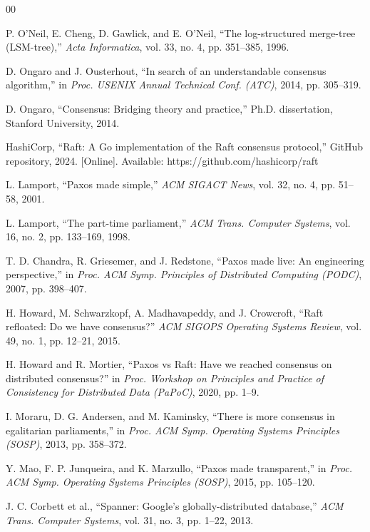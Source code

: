 \documentclass[conference, a4paper]{IEEEtran}
\begin{document}
\begin{thebibliography}{00}

P. O'Neil, E. Cheng, D. Gawlick, and E. O'Neil, ``The log-structured
merge-tree (LSM-tree),'' \textit{Acta Informatica}, vol. 33, no. 4,
pp. 351--385, 1996.

D. Ongaro and J. Ousterhout, ``In search of an understandable consensus
algorithm,'' in \textit{Proc. USENIX Annual Technical Conf. (ATC)},
2014, pp. 305--319.

D. Ongaro, ``Consensus: Bridging theory and practice,'' Ph.D.
dissertation, Stanford University, 2014.

HashiCorp, ``Raft: A Go implementation of the Raft consensus
protocol,'' GitHub repository, 2024. [Online]. Available:
https://github.com/hashicorp/raft

L. Lamport, ``Paxos made simple,'' \textit{ACM SIGACT News}, vol. 32,
no. 4, pp. 51--58, 2001.

L. Lamport, ``The part-time parliament,'' \textit{ACM Trans. Computer
Systems}, vol. 16, no. 2, pp. 133--169, 1998.

T. D. Chandra, R. Griesemer, and J. Redstone, ``Paxos made live: An
engineering perspective,'' in \textit{Proc. ACM Symp. Principles of
Distributed Computing (PODC)}, 2007, pp. 398--407.

H. Howard, M. Schwarzkopf, A. Madhavapeddy, and J. Crowcroft, ``Raft
refloated: Do we have consensus?'' \textit{ACM SIGOPS Operating Systems
Review}, vol. 49, no. 1, pp. 12--21, 2015.

H. Howard and R. Mortier, ``Paxos vs Raft: Have we reached consensus on
distributed consensus?'' in \textit{Proc. Workshop on Principles and
Practice of Consistency for Distributed Data (PaPoC)}, 2020, pp. 1--9.

I. Moraru, D. G. Andersen, and M. Kaminsky, ``There is more consensus
in egalitarian parliaments,'' in \textit{Proc. ACM Symp. Operating
Systems Principles (SOSP)}, 2013, pp. 358--372.

Y. Mao, F. P. Junqueira, and K. Marzullo, ``Paxos made transparent,'' in
\textit{Proc. ACM Symp. Operating Systems Principles (SOSP)}, 2015,
pp. 105--120.

J. C. Corbett et al., ``Spanner: Google's globally-distributed
database,'' \textit{ACM Trans. Computer Systems}, vol. 31, no. 3,
pp. 1--22, 2013.


\end{thebibliography}
\end{document}
